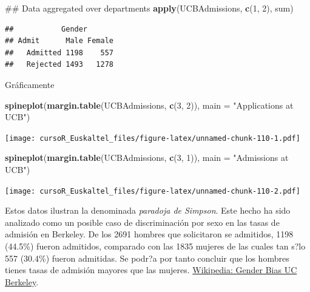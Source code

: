 \documentclass[]{book}
\newenvironment{Shaded}{\begin{snugshade}}{\end{snugshade}}
\newcommand{\KeywordTok}[1]{\textcolor[rgb]{0.13,0.29,0.53}{\textbf{#1}}}
\newcommand{\DataTypeTok}[1]{\textcolor[rgb]{0.13,0.29,0.53}{#1}}
\newcommand{\DecValTok}[1]{\textcolor[rgb]{0.00,0.00,0.81}{#1}}
\newcommand{\StringTok}[1]{\textcolor[rgb]{0.31,0.60,0.02}{#1}}
\newcommand{\NormalTok}[1]{#1}
\begin{document}
\begin{Shaded}
\begin{Highlighting}[]
\NormalTok{## Data aggregated over departments}
\KeywordTok{apply}\NormalTok{(UCBAdmissions, }\KeywordTok{c}\NormalTok{(}\DecValTok{1}\NormalTok{, }\DecValTok{2}\NormalTok{), sum)}
\end{Highlighting}
\end{Shaded}

\begin{verbatim}
##           Gender
## Admit      Male Female
##   Admitted 1198    557
##   Rejected 1493   1278
\end{verbatim}

Gráficamente

\begin{Shaded}
\begin{Highlighting}[]
\KeywordTok{spineplot}\NormalTok{(}\KeywordTok{margin.table}\NormalTok{(UCBAdmissions, }\KeywordTok{c}\NormalTok{(}\DecValTok{3}\NormalTok{, }\DecValTok{2}\NormalTok{)),}
           \DataTypeTok{main =} \StringTok{"Applications at UCB"}\NormalTok{)}
\end{Highlighting}
\end{Shaded}

\texttt{[image: cursoR\_Euskaltel\_files/figure-latex/unnamed-chunk-110-1.pdf]}

\begin{Shaded}
\begin{Highlighting}[]
\KeywordTok{spineplot}\NormalTok{(}\KeywordTok{margin.table}\NormalTok{(UCBAdmissions, }\KeywordTok{c}\NormalTok{(}\DecValTok{3}\NormalTok{, }\DecValTok{1}\NormalTok{)),}
           \DataTypeTok{main =} \StringTok{"Admissions at UCB"}\NormalTok{)}
\end{Highlighting}
\end{Shaded}

\texttt{[image: cursoR\_Euskaltel\_files/figure-latex/unnamed-chunk-110-2.pdf]}

Estos datos ilustran la denominada \emph{paradoja de Simpson}. Este
hecho ha sido analizado como un posible caso de discriminación por sexo
en las tasas de admisión en Berkeley. De los 2691 hombres que
solicitaron se admitidos, 1198 (44.5\%) fueron admitidos, comparado con
las 1835 mujeres de las cuales tan s?lo 557 (30.4\%) fueron admitidas.
Se podr?a por tanto concluir que los hombres tienes tasas de admisión
mayores que las mujeres.
\href{https://en.wikipedia.org/wiki/Simpson\%27s_paradox\#UC_Berkeley_gender_bias}{Wikipedia:
Gender Bias UC Berkeley}.
\end{document}
